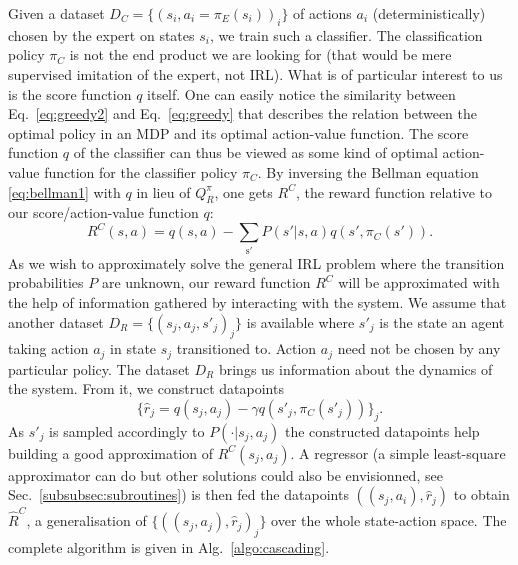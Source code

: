 \documentclass[smallextended]{svjour3}
\begin{document}
Given a dataset $D_C = \{(s_i,a_i=\pi_E(s_i))_i\}$ of actions $a_i$ (deterministically) chosen by the expert on states $s_i$, we train such a classifier. The classification policy $\pi_C$ is not the end product we are looking for (that would be mere supervised imitation of the expert, not IRL). What is of particular interest to us is the score function $q$ itself. One can easily notice the similarity between Eq.~\eqref{eq:greedy2} and Eq.~\eqref{eq:greedy} that describes the relation between the optimal policy in an MDP and its optimal action-value function. The score function $q$ of the classifier can thus be viewed as some kind of optimal action-value function for the classifier policy $\pi_C$. By inversing the Bellman equation \eqref{eq:bellman1} with $q$ in lieu of $Q^\pi_R$, one gets $R^C$, the reward function relative to our score/action-value function $q$:
\begin{equation}
  \label{eq:rc}
  R^C(s,a) =q(s,a) - \sum_{\mathrm{s'}}P(s'|s,a)q(s',\pi_C(s')).
\end{equation}
As we wish to approximately solve the general IRL problem where the transition probabilities $P$ are unknown, our reward function $R^C$ will be approximated with the help of information gathered by interacting with the system. We assume that another dataset $D_R = \{(s_j,a_j,s'_j)_j\}$ is available where $s'_j$ is the state an agent taking action $a_j$ in state $s_j$ transitioned to. Action $a_j$ need not be chosen by any particular policy. The dataset $D_R$ brings us information about the dynamics of the system. From it, we construct datapoints
\begin{equation}
  \label{eq:rj}
  \{\hat r_j = q(s_j,a_j) - \gamma q(s'_j,\pi_C(s'_j))\}_j.
\end{equation}
As $s'_j$ is sampled accordingly to $P(\cdot|s_j,a_j)$ the constructed datapoints help building a good approximation of $R^C(s_j,a_j)$. A regressor (a simple least-square approximator can do but other solutions could also be envisionned, see Sec.~\ref{subsubsec:subroutines}) is then fed the datapoints $((s_j,a_i),\hat r_j)$ to obtain $\hat R^C$, a generalisation of $\{((s_j,a_j),\hat r_j)_j\}$ over the whole state-action space. The complete algorithm is given in Alg.~\ref{algo:cascading}.
\end{document}
